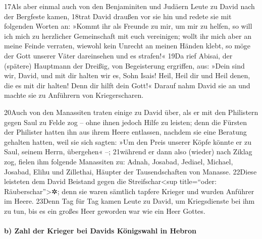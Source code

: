17Als aber einmal auch von den Benjaminiten und Judäern Leute zu David
nach der Bergfeste kamen, 18trat David draußen vor sie hin und redete
sie mit folgenden Worten an: »Kommt ihr als Freunde zu mir, um mir zu
helfen, so will ich mich zu herzlicher Gemeinschaft mit euch vereinigen;
wollt ihr mich aber an meine Feinde verraten, wiewohl kein Unrecht an
meinen Händen klebt, so möge der Gott unserer Väter dareinsehen und es
strafen!« 19Da rief Abisai, der (spätere) Hauptmann der Dreißig, von
Begeisterung ergriffen, aus: »Dein sind wir, David, und mit dir halten
wir es, Sohn Isais! Heil, Heil dir und Heil denen, die es mit dir
halten! Denn dir hilft dein Gott!« Darauf nahm David sie an und machte
sie zu Anführern von Kriegerscharen.

20Auch von den Manassiten traten einige zu David über, als er mit den
Philistern gegen Saul zu Felde zog -- ohne ihnen jedoch Hilfe zu
leisten; denn die Fürsten der Philister hatten ihn aus ihrem Heere
entlassen, nachdem sie eine Beratung gehalten hatten, weil sie sich
sagten: »Um den Preis unserer Köpfe könnte er zu Saul, seinem Herrn,
übergehen« --; 21während er dann also (wieder) nach Ziklag zog, fielen
ihm folgende Manassiten zu: Adnah, Josabad, Jediael, Michael, Josabad,
Elihu und Zillethai, Häupter der Tausendschaften von Manasse. 22Diese
leisteten dem David Beistand gegen die Streifschar\textless sup
title=``oder: Räuberschar''\textgreater✲; denn sie waren sämtlich
tapfere Krieger und wurden Anführer im Heere. 23Denn Tag für Tag kamen
Leute zu David, um Kriegsdienste bei ihm zu tun, bis es ein großes Heer
geworden war wie ein Heer Gottes.

\hypertarget{b-zahl-der-krieger-bei-davids-kuxf6nigswahl-in-hebron}{%
\paragraph{b) Zahl der Krieger bei Davids Königswahl in
Hebron}\label{b-zahl-der-krieger-bei-davids-kuxf6nigswahl-in-hebron}}

